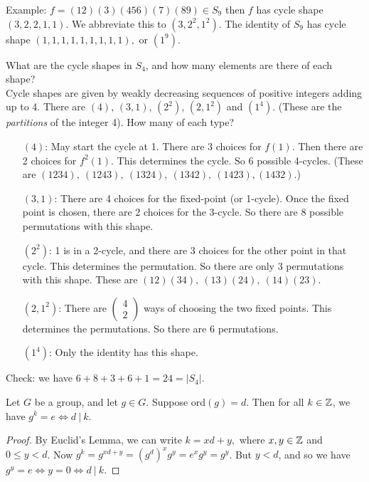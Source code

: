 Example: $f = (12)(3)(456)(7)(89) \in S_9$ then $f$ has cycle shape $(3,2,2,1,1)$. We abbreviate this to $(3,2^2,1^2).$ The identity of $S_9$ has cycle shape $(1,1,1,1,1,1,1,1,1),$ or  $(1^9)$.\\


\begin{examples}What are the cycle shapes in $S_4$, and how many elements are there of each shape?\\

Cycle shapes are given by weakly decreasing sequences of positive integers adding up to 4. There are $(4)$, $(3,1)$, $(2^2)$, $(2,1^2)$ and $(1^4)$. (These are the \emph{partitions} of the integer 4). How many of each type? \begin{itemize}
 \item[$(4)$:] May start the cycle at 1. There are 3 choices for $f(1)$. Then there are 2 choices for $f^2(1)$. This determines the cycle. So 6 possible 4-cycles. (These are $(1234),~(1243),~(1324),~(1342),~(1423),(1432)$.)
 \item[$(3,1)$:] There are 4 choices for the fixed-point (or 1-cycle).  Once the fixed point is chosen, there are 2 choices for the 3-cycle. So there are 8 possible permutations with this shape.
 \item[$(2^2)$:] 1 is in a 2-cycle, and there are 3 choices for the other point in that cycle. This determines the permutation. So there are only 3 permutations with this shape. These are $(12)(34),~(13)(24),~(14)(23)$.
 \item[$(2,1^2)$:] There are $\left(\begin{smallmatrix}
4 \\ 2	
\end{smallmatrix}\right)$ ways of choosing the two fixed points. This determines the permutations. So there are 6 permutations.
\item[$(1^4)$:] Only the identity has this shape. 
 \end{itemize}
 
 Check: we have $6 + 8 + 3 + 6 + 1 = 24 = |S_4|$.
\end{examples}


 
\begin{proposition} Let $G$ be a group, and let $g \in G$. Suppose ord$(g) = d$. Then for all $k\in \mathbb{Z}$, we have $g^k = e \iff d~|~k $.	
\end{proposition}

 
 \begin{proof}
 By Euclid's Lemma, we can write $k = xd + y,$ where $x,y \in \mathbb{Z}$ and $0 \leq y < d$. Now $g^k = g^{xd + y} = (g^d)^xg^y = e^xg^y = g^y$. But $y < d$, and so we have $g^y = e \iff y =0 \iff d~|~k$.
 \end{proof}\vspace*{10pt}
 
